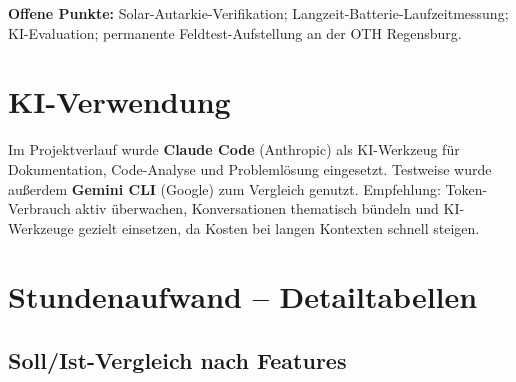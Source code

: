 \documentclass[11pt,a4paper]{scrartcl}
\begin{document}
\textbf{Offene Punkte:} Solar-Autarkie-Verifikation; Langzeit-Batterie-Laufzeitmessung; KI-Evaluation; permanente Feldtest-Aufstellung an der OTH Regensburg.

\section{KI-Verwendung}

Im Projektverlauf wurde \textbf{Claude Code} (Anthropic) als KI-Werkzeug für Dokumentation, Code-Analyse und Problemlösung eingesetzt. Testweise wurde außerdem \textbf{Gemini CLI} (Google) zum Vergleich genutzt. Empfehlung: Token-Verbrauch aktiv überwachen, Konversationen thematisch bündeln und KI-Werkzeuge gezielt einsetzen, da Kosten bei langen Kontexten schnell steigen.

\clearpage
\appendix

\section{Stundenaufwand -- Detailtabellen}
\label{app:stunden}

\subsection*{Soll/Ist-Vergleich nach Features}
\end{document}
